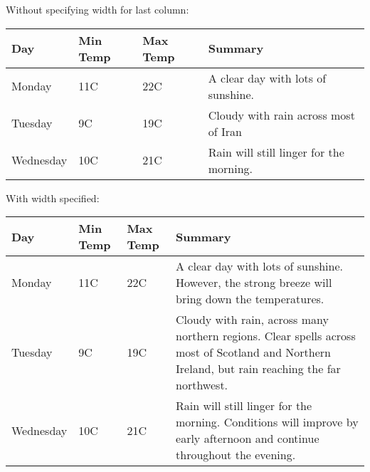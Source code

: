\documentclass{article}
\begin{document}
Without specifying width for last column:
 \begin{center}
           \begin{tabular}{| l | l | l | l |}
            \hline
                 Day & Min Temp & Max Temp & Summary \\ \hline
                 Monday & 11C & 22C & A clear day with lots of sunshine. 
                 \\ \hline
                 Tuesday & 9C & 19C & Cloudy with rain 
                 across most of Iran \\ \hline
                 Wednesday & 10C & 21C & Rain will still linger for the morning. 
                 \\
                 \hline
         \end{tabular}
 \end{center}

With width specified:
        \begin{center}
               \begin{tabular}{ | l | l | l | p{5cm} |}
               \hline
               Day & Min Temp & Max Temp & Summary \\ \hline
               Monday & 11C & 22C & A clear day with lots of sunshine.  
               However, the strong breeze will bring down the temperatures. \\ \hline
               Tuesday & 9C & 19C & Cloudy with rain, across many northern regions. Clear spells 
               across most of Scotland and Northern Ireland, 
               but rain reaching the far northwest. \\ \hline
               Wednesday & 10C & 21C & Rain will still linger for the morning. 
               Conditions will improve by early afternoon and continue 
               throughout the evening. \\
               \hline
        \end{tabular}
    \end{center}
\end{document}

